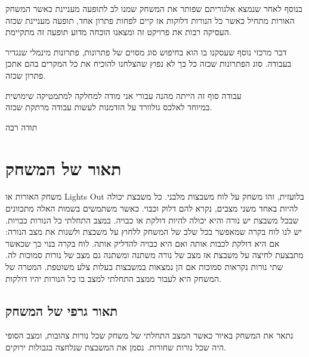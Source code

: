 \documentclass[12pt,leqno]{article}
\begin{document}
בנוסף 
לאחר שנמצא אלגוריתם שפותר את המשחק שמנו לב לתופעה מעניינת  כאשר המשחק האורות
מתחיל כאשר כל הנורות דלוקות אז קיים לפחות פתרון אחד,
תופעה מעניינת שכזה העסיקה רבות את פרויקט זה ומצאנו הוכחה מדוע תופעה זה מתקיימת.

דבר מרכזי נוסף שעסקנו בו הוא בחיפוש סוג מסוים של פתרונות, פתרונות מינמלי שנגדיר בעבודה. 
סוג הפתרונות שכזה כל כך לא נפוץ שהצלחנו להוכיח את כל המקרים 
בהם אתכן פתרון שכזה.

עבודה סוף זה הייתה מהנה עבורי אני מודה למחלקה
למתמטיקה שימושית
\\
במיוחד לאלכס גולוורד על הזדמנות לעשות 
עבודה מרתקת שכזה.

תודה רבה

\newpage

\section{תאור של המשחק}
משחק האורות או 
\textenglish{Lights Out}
בלועזית,
זהו משחק על לוח משבצות מלבני.
כל משבצת יכולה להיות באחד משני מצבים, נקרא להם דלוק וכבוי.
כאשר משתמשים בשמות האלה מתכוונים שבכל משבצת יש נורה והיא יכולה להיות דולקת או כבויה. במצב התחלתי כל הנורות כבויות.
יש לנו לוח בקרה שמאפשר בכל שלב של המשחק ללחוץ על משבצת ולשנות את מצב הנורה: אם היא דולקת לכבות אותה ואם היא כבויה להדליק אותה.
לוח בקרה בנוי כך שכאשר מתבצעת לחיצה על משבצת אז מצב של נורה משתנה ומשתנה גם מצב של נורות סמוכות לה.
שתי נורות נקראות סמוכות אם הן נמצאות במשבצות בעלות צלע משוטפת.
המטרה של המשחק היא לעבור ממצב התחלתי למצב בו כל הנורות יהיו דולקות. 
\subsection{תאור גרפי של המשחק}
נתאר את המשחק באיור כאשר
המצב התחלתי של משחק שכל נורות
צהובות, ומצב הסופי היה שכל נורות שחורות.
נסמן את המשבצת שנלחצה בגבולות ירוקים.
\end{document}

